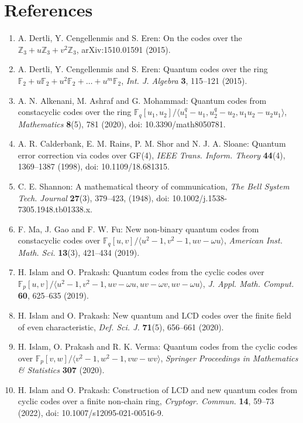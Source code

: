 \documentclass[12pt]{article}
\begin{document}
\section*{References}
\begin{enumerate}
\item A. Dertli, Y. Cengellenmis and S. Eren: On the codes over the $\mathbb{Z}_3 + u\mathbb{Z}_3 + v^2\mathbb{Z}_3$, arXiv:1510.01591 (2015).
\item A. Dertli, Y. Cengellenmis and S. Eren: Quantum codes over the ring $\mathbb{F}_2 + u\mathbb{F}_2 + u^2\mathbb{F}_2 + \dots + u^m\mathbb{F}_2$, \textit{Int. J. Algebra} \textbf{3}, 115--121 (2015).
\item A. N. Alkenani, M. Ashraf and G. Mohammad: Quantum codes from constacyclic codes over the ring $\mathbb{F}_q[u_1,u_2]/\langle u_1^q - u_1, u_2^q - u_2, u_1u_2 - u_2u_1 \rangle$, \textit{Mathematics} \textbf{8}(5), 781 (2020), doi: 10.3390/math8050781.
\item A. R. Calderbank, E. M. Rains, P. M. Shor and N. J. A. Sloane: Quantum error correction via codes over GF(4), \textit{IEEE Trans. Inform. Theory} \textbf{44}(4), 1369--1387 (1998), doi: 10.1109/18.681315.
\item C. E. Shannon: A mathematical theory of communication, \textit{The Bell System Tech. Journal} \textbf{27}(3), 379--423, (1948), doi: 10.1002/j.1538-7305.1948.tb01338.x.
\item F. Ma, J. Gao and F. W. Fu: New non-binary quantum codes from constacyclic codes over $\mathbb{F}_q[u,v]/\langle u^2 - 1, v^2 - 1, uv - \omega u \rangle$, \textit{American Inst. Math. Sci.} \textbf{13}(3), 421--434 (2019).
\item H. Islam and O. Prakash: Quantum codes from the cyclic codes over $\mathbb{F}_p[u,v]/\langle u^2 - 1, v^2 - 1, uv - \omega u, uv - \omega v, uv - \omega u \rangle$, \textit{J. Appl. Math. Comput.} \textbf{60}, 625--635 (2019).
\item H. Islam and O. Prakash: New quantum and LCD codes over the finite field of even characteristic, \textit{Def. Sci. J.} \textbf{71}(5), 656--661 (2020).
\item H. Islam, O. Prakash and R. K. Verma: Quantum codes from the cyclic codes over $\mathbb{F}_p[v,w]/\langle v^2 - 1, w^2 - 1, vw - wv \rangle$, \textit{Springer Proceedings in Mathematics \\& Statistics} \textbf{307} (2020).
\item H. Islam and O. Prakash: Construction of LCD and new quantum codes from cyclic codes over a finite non-chain ring, \textit{Cryptogr. Commun.} \textbf{14}, 59--73 (2022), doi: 10.1007/s12095-021-00516-9.

\end{enumerate}
\end{document}
